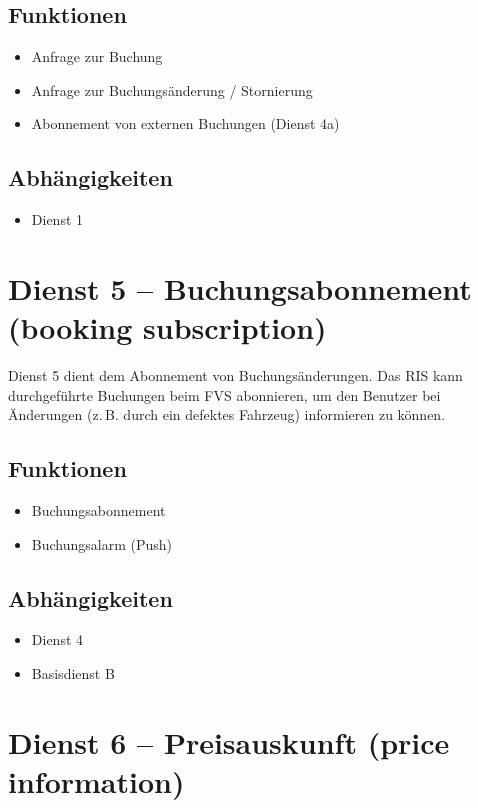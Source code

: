 \subsection*{Funktionen}
\begin{itemize}
\item Anfrage zur Buchung
\item Anfrage zur Buchungsänderung / Stornierung
\item Abonnement von externen Buchungen (Dienst 4a)
\end{itemize}

\subsection*{Abhängigkeiten}
\begin{itemize}
\item Dienst 1
\end{itemize}

\section{Dienst 5 -- Buchungsabonnement (booking subscription)}
\label{sec:Hierachiemodell:Dienst5}
Dienst 5 dient dem Abonnement von Buchungsänderungen. Das RIS kann durchgeführte Buchungen beim FVS abonnieren, um den Benutzer bei Änderungen (z.\,B. durch ein defektes Fahrzeug) informieren zu können.

\subsection*{Funktionen}
\begin{itemize}
\item Buchungsabonnement
\item Buchungsalarm (Push)
\end{itemize}

\subsection*{Abhängigkeiten}
\begin{itemize}
\item Dienst 4
\item Basisdienst B
\end{itemize}

\section{Dienst 6 -- Preisauskunft (price information)}
\label{sec:Hierachiemodell:Dienst6}

